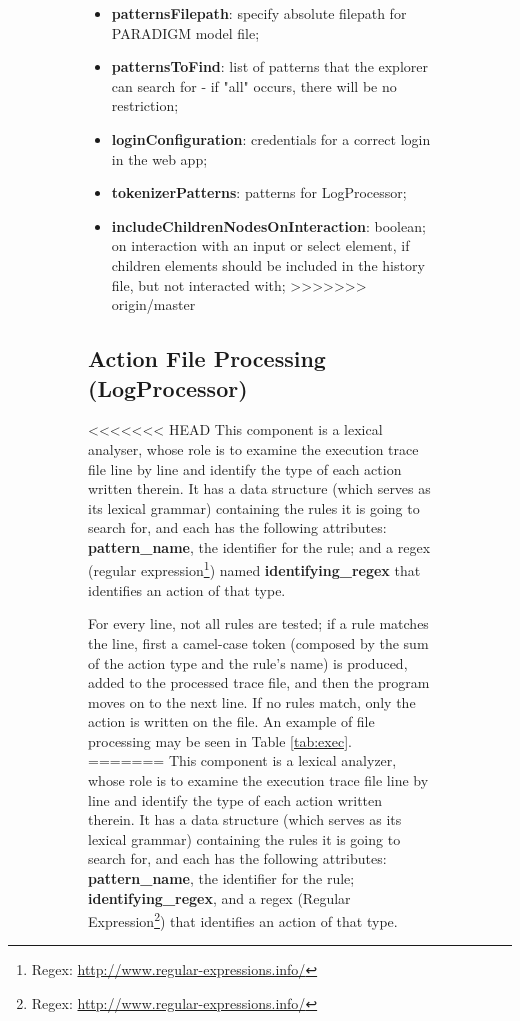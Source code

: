 \documentclass[conference]{IEEEtran}
\begin{document}
\begin{enumerate}
\begin{figure}[!htb]
\begin{itemize}
\begin{figure}[!htb]
\begin{itemize}
\begin{itemize}
\item[] \textbf{patternsFilepath}: specify absolute filepath for PARADIGM model file;
\item[] \textbf{patternsToFind}: list of patterns that the explorer can search for - if "all" occurs, there will be no restriction;
\item[] \textbf{loginConfiguration}: credentials for a correct login in the web app;		
\item[] \textbf{tokenizerPatterns}: patterns for LogProcessor;
\item[] \textbf{includeChildrenNodesOnInteraction}: boolean; on interaction with an input or select element, if children elements should be included  in the history file, but not interacted with;
>>>>>>> origin/master
\end{itemize}

\subsection{Action File Processing (LogProcessor)}\label{sec:fp}

<<<<<<< HEAD
This component is a lexical analyser, whose role is to examine the execution trace file line by line and identify the type of each action written therein. It has a data structure (which serves as its lexical grammar) containing the rules it is going to search for, and each has the following attributes: \textbf{pattern\_name}, the identifier for the rule; and a regex (regular expression\footnote{Regex: \url{http://www.regular-expressions.info/}}) named \textbf{identifying\_regex} that identifies an action of that type. 

For every line, not all rules are tested; if a rule matches the line, first a camel-case token (composed by the sum of the action type and the rule's name) is produced, added to the processed trace file, and then the program moves on to the next line. If no rules match, only the action is written on the file. An example of file processing may be seen in Table \ref{tab:exec}.
=======
This component is a lexical analyzer, whose role is to examine the execution trace file line by line and identify the type of each action written therein. It has a data structure (which serves as its lexical grammar) containing the rules it is going to search for, and each has the following attributes: \textbf{pattern\_name}, the identifier for the rule; \textbf{identifying\_regex}, and a regex (Regular Expression\footnote{Regex: \url{http://www.regular-expressions.info/}}) that identifies an action of that type. \\


\end{itemize}
\end{figure}
\end{itemize}
\end{figure}
\end{enumerate}
\end{document}
